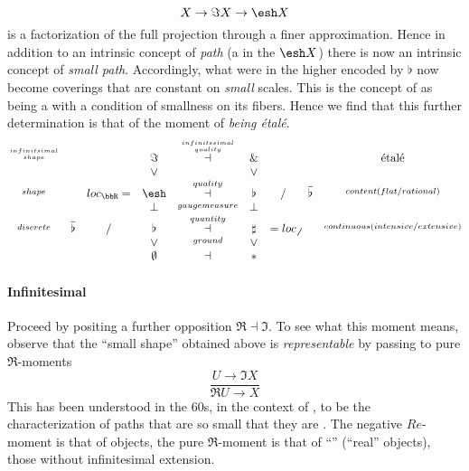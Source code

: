 \begin{displaymath}
X \to \Im X \to \esh  X
\end{displaymath}
is a factorization of the full  projection through a finer approximation. Hence in addition to an intrinsic concept of \emph{path} (a  in the  $\esh  X$) there is now an intrinsic concept of \emph{small path}.
Accordingly, what were  in the higher  encoded by $\flat$ now become coverings that are constant on \emph{small} scales. This is the concept of  as being a  with a condition of smallness on its fibers.
Hence we find that this further determination is that of the moment of \emph{being étalé}.
\begin{displaymath}
\itexarray{
\stackrel{infinitsimal \atop shape}{} && & \Im &\stackrel{infinitesimal \atop quality}{\dashv}& \& & && \text{étalé}
\\
&& & \vee && \vee
\\
\stackrel{shape}{} && loc_{\bbR} = & \esh  &\stackrel{quality}{\dashv}& \flat & / & \overline{\flat}&  \stackrel{content(flat/rational)}{}
\\
&& & \bot &\stackrel{gaugemeasure}{}& \bot
\\
\stackrel{discrete}{} &\overline{\flat}& / & \flat &\stackrel{quantity}{\dashv}& \sharp & = loc_{\not\not}  &   & \stackrel{continuous (intensive/extensive)}{}
\\
&& & \vee &\stackrel{ground}{}& \vee
\\
&& & \emptyset &\dashv& \ast &
}
\end{displaymath}
\hypertarget{infinitesimal}{}\paragraph*{{Infinitesimal}}\label{infinitesimal}
Proceed by positing a further opposition $\Re \dashv \Im$.
To see what this moment means, observe that the ``small shape'' obtained above is \emph{representable} by passing to pure $\Re$-moments
\begin{displaymath}
\frac{U \to \Im X}{\Re U \to X}
\end{displaymath}
This has been understood in the 60s, in the context of , to be the characterization of paths that are so small that they are . The negative $Re$-moment is that of  objects, the pure $\Re$-moment is that of ``'' (``real'' objects), those without infinitesimal extension.
